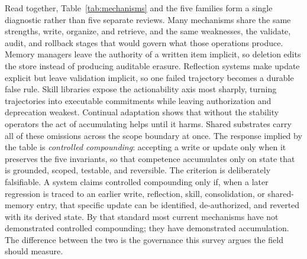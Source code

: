 Read together, Table~\ref{tab:mechanisms} and the five families form a single diagnostic rather than five separate reviews. Many mechanisms share the same strengths, write, organize, and retrieve, and the same weaknesses, the validate, audit, and rollback stages that would govern what those operations produce. Memory managers leave the authority of a written item implicit, so deletion edits the store instead of producing auditable erasure. Reflection systems make update explicit but leave validation implicit, so one failed trajectory becomes a durable false rule. Skill libraries expose the actionability axis most sharply, turning trajectories into executable commitments while leaving authorization and deprecation weakest. Continual adaptation shows that without the stability operators the act of accumulating helps until it harms. Shared substrates carry all of these omissions across the scope boundary at once. The response implied by the table is \emph{controlled compounding}: accepting a write or update only when it preserves the five invariants, so that competence accumulates only on state that is grounded, scoped, testable, and reversible. The criterion is deliberately falsifiable. A system claims controlled compounding only if, when a later regression is traced to an earlier write, reflection, skill, consolidation, or shared-memory entry, that specific update can be identified, de-authorized, and reverted with its derived state. By that standard most current mechanisms have not demonstrated controlled compounding; they have demonstrated accumulation. The difference between the two is the governance this survey argues the field should measure.
